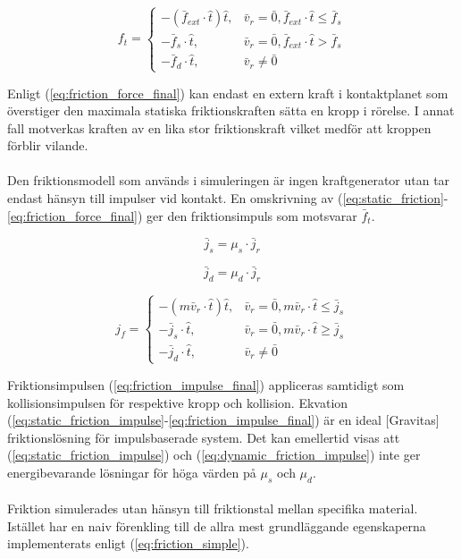 \documentclass[a4paper,12pt,twopage,swedish]{article}
\begin{document}
\begin{equation}\label{eq:friction_force_final}
f_t =\begin{cases}
    -(\bar{f}_{ext} \cdot \hat{t})\hat{t}, & \bar{v}_r = \bar{0}, \bar{f}_{ext} \cdot \hat{t} \le \bar{f}_s \\
    -\bar{f}_s \cdot \hat{t}, & \bar{v}_r = \bar{0}, \bar{f}_{ext} \cdot \hat{t} > \bar{f}_s \\
    - \bar{f}_d \cdot \hat{t} , & \bar{v}_r \ne \bar{0}
  \end{cases}
\end{equation}

Enligt (\ref{eq:friction_force_final}) kan endast en extern kraft i kontaktplanet som överstiger den maximala statiska friktionskraften sätta en kropp i rörelse. I annat fall motverkas kraften av en lika stor friktionskraft vilket medför att kroppen förblir vilande.
\\
\\Den friktionsmodell som används i simuleringen är ingen kraftgenerator utan tar endast hänsyn till impulser vid kontakt. En omskrivning av (\ref{eq:static_friction}-\ref{eq:friction_force_final}) ger den friktionsimpuls som motsvarar $\bar{f}_t$.

\begin{equation}\label{eq:static_friction_impulse}
\bar{j}_s = \mu_s \cdot \bar{j}_r
\end{equation}

\begin{equation}\label{eq:dynamic_friction_impulse}
\bar{j}_d = \mu_d \cdot \bar{j}_r
\end{equation}

\begin{equation}\label{eq:friction_impulse_final}
j_f =\begin{cases}
    -(m\bar{v}_r \cdot \hat{t})\hat{t}, & \bar{v}_r = \bar{0}, m\bar{v}_r \cdot \hat{t} \le \bar{j}_s \\
    -\bar{j}_s \cdot \hat{t}, & \bar{v}_r = \bar{0}, m\bar{v}_r \cdot \hat{t} \ge \bar{j}_s \\
    - \bar{j}_d \cdot \hat{t} , & \bar{v}_r \ne \bar{0}
  \end{cases}
\end{equation}

Friktionsimpulsen (\ref{eq:friction_impulse_final}) appliceras samtidigt som kollisionsimpulsen för respektive kropp och kollision. Ekvation (\ref{eq:static_friction_impulse}-\ref{eq:friction_impulse_final}) är en ideal [Gravitas] friktionslösning för impulsbaserade system. Det kan emellertid visas att (\ref{eq:static_friction_impulse}) och (\ref{eq:dynamic_friction_impulse}) inte ger energibevarande lösningar för höga värden på $\mu_s$ och $\mu_d$.
\\
\\Friktion simulerades utan hänsyn till friktionstal mellan specifika material. Istället har en naiv förenkling till de allra mest grundläggande egenskaperna implementerats enligt (\ref{eq:friction_simple}).
\end{document}
